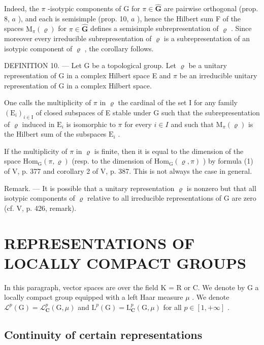 Indeed, the \(\pi\) -isotypic components of G for \(\pi \in \widehat{\mathbf{G}}\) are pairwise orthogonal (prop. 8, \(a\) ), and each is semisimple (prop. 10, \(a\) ), hence the Hilbert sum F of the spaces \(\mathrm{M}_{\pi}(\varrho)\) for \(\pi \in \widehat{\mathbf{G}}\) defines a semisimple subrepresentation of \(\varrho\) . Since moreover every irreducible subrepresentation of \(\varrho\) is a subrepresentation of an isotypic component of \(\varrho\) , the corollary follows.

DEFINITION 10. --- Let G be a topological group. Let \(\varrho\) be a unitary representation of G in a complex Hilbert space E and \(\pi\) be an irreducible unitary representation of G in a complex Hilbert space.

One calls the multiplicity of \(\pi\) in \(\varrho\) the cardinal of the set I for any family \((\mathrm{E}_i)_{i\in \mathrm{I}}\) of closed subspaces of E stable under G such that the subrepresentation of \(\varrho\) induced in \(\mathrm{E}_i\) is isomorphic to \(\pi\) for every \(i\in I\) and such that \(\mathrm{M}_{\pi}(\varrho)\) is the Hilbert sum of the subspaces \(\mathrm{E}_i\) .

If the multiplicity of \(\pi\) in \(\varrho\) is finite, then it is equal to the dimension of the space \(\mathrm{Hom}_{\mathrm{G}}(\pi, \varrho)\) (resp. to the dimension of \(\mathrm{Hom}_{\mathrm{G}}(\varrho, \pi)\) ) by formula (1) of V, p. 377 and corollary 2 of V, p. 387. This is not always the case in general.

Remark. --- It is possible that a unitary representation \(\varrho\) is nonzero but that all isotypic components of \(\varrho\) relative to all irreducible representations of G are zero (cf. V, p. 426, remark).

\section{REPRESENTATIONS OF LOCALLY COMPACT GROUPS}

In this paragraph, vector spaces are over the field K = R or C. We denote by G a locally compact group equipped with a left Haar measure \(\mu\) . We denote \(\mathcal{L}^{p}(\mathrm{G}) = \mathcal{L}_{\mathbf{C}}^{p}(\mathrm{G}, \mu)\) and \(\mathrm{L}^{p}(\mathrm{G}) = \mathrm{L}_{\mathbf{C}}^{p}(\mathrm{G}, \mu)\) for all \(p \in [1, +\infty]\) .

\subsection{Continuity of certain representations}

